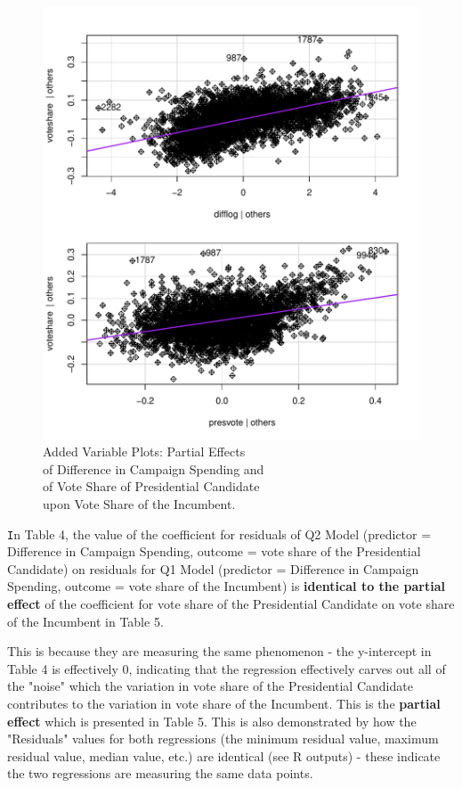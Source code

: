 \documentclass[12pt,letterpaper]{article}
\begin{document}
\begin{enumerate}
			\begin{figure}[H]
				\centering
				\captionsetup{justification=centering, font = footnotesize}
				\caption{Added Variable Plots: Partial Effects\\
					of Difference in Campaign Spending and\\
					of Vote Share of Presidential Candidate\\
					upon Vote Share of the Incumbent.}
				\label{fig:plot_Q5}
				\includegraphics[width=.75\textwidth, clip]{plot_Q5.pdf}
			\end{figure}
			
			
			
			\texttt In Table 4, the value of the coefficient for residuals of Q2 Model (predictor = Difference in Campaign Spending, outcome = vote share of the Presidential Candidate) on residuals for Q1 Model (predictor = Difference in Campaign Spending, outcome = vote share of the Incumbent) is \textbf{identical to the partial effect} of the coefficient for vote share of the Presidential Candidate on vote share of the Incumbent in Table 5.
			
			This is because they are measuring the same phenomenon - the y-intercept in Table 4 is effectively 0, indicating that the regression effectively carves out all of the "noise" which the {variation in vote share of the Presidential Candidate} contributes to the {variation in vote share of the Incumbent}. This is the \textbf{partial effect} which is presented in Table 5. This is also demonstrated by how the "Residuals" values for both regressions (the minimum residual value, maximum residual value, median value, etc.) are identical (see R outputs) - these indicate the two regressions are measuring the same data points.
			

\end{enumerate}
\end{document}
